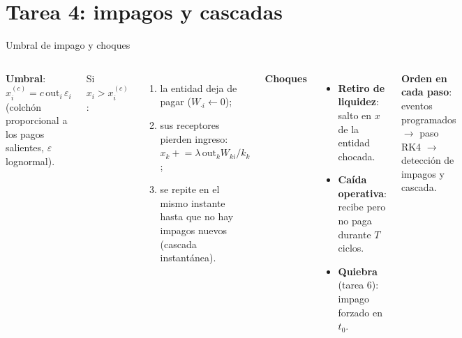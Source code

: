 \documentclass[aspectratio=169,10pt]{beamer}
\begin{document}
\section{Tarea 4: impagos y cascadas}

\begin{frame}{Umbral de impago y choques}
\begin{columns}[T]
\textbf{Umbral}: $x_i^{(c)} = c\,\mathrm{out}_i\,\varepsilon_i$ (colchón proporcional a
los pagos salientes, $\varepsilon$ lognormal).
\vspace{0.1cm}

Si $x_i>x_i^{(c)}$:
\begin{enumerate}
\item la entidad deja de pagar ($W_{\cdot i}\leftarrow0$);
\item sus receptores pierden ingreso:
$x_k \mathrel{+}= \lambda\,\mathrm{out}_k W_{ki}/k_k$;
\item se repite en el mismo instante hasta que no hay impagos nuevos (cascada
instantánea).
\end{enumerate}
\textbf{Choques}
\begin{itemize}
\item \textbf{Retiro de liquidez}: salto en $x$ de la entidad chocada.
\item \textbf{Caída operativa}: recibe pero no paga durante $T$ ciclos.
\item \textbf{Quiebra} (tarea 6): impago forzado en $t_0$.
\end{itemize}
\textbf{Orden en cada paso}: eventos programados $\to$ paso RK4 $\to$ detección de
impagos y cascada.
\end{columns}
\end{frame}
\end{document}
